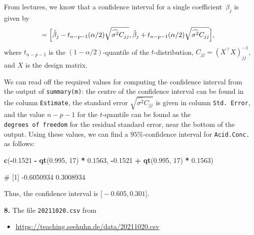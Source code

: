 \documentclass[
  a4paper,
]{article}
\newenvironment{Shaded}{\begin{snugshade}}{\end{snugshade}}
\newcommand{\DecValTok}[1]{\textcolor[rgb]{0.00,0.00,0.81}{#1}}
\newcommand{\FloatTok}[1]{\textcolor[rgb]{0.00,0.00,0.81}{#1}}
\newcommand{\FunctionTok}[1]{\textcolor[rgb]{0.13,0.29,0.53}{\textbf{#1}}}
\newcommand{\NormalTok}[1]{#1}
\newcommand{\SpecialCharTok}[1]{\textcolor[rgb]{0.81,0.36,0.00}{\textbf{#1}}}
\providecommand{\tightlist}{%
  \setlength{\itemsep}{0pt}\setlength{\parskip}{0pt}}
\theoremstyle{definition}
\theoremstyle{definition}
\theoremstyle{definition}
\theoremstyle{definition}
\theoremstyle{remark}
\begin{document}
\begin{myanswers}
From lectures, we know that a confidence interval for a single
coefficient~\(\beta_j\) is given by
\begin{equation*}
  [U, V]
  = \Bigl[ \hat\beta_j - t_{n-p-1}(\alpha/2) \sqrt{\widehat{\sigma^2} C_{jj}},
        \hat\beta_j + t_{n-p-1}(\alpha/2) \sqrt{\widehat{\sigma^2} C_{jj}} \Bigr],
\end{equation*}
where \(t_{n-p-1}\) is the \((1-\alpha/2)\)-quantile of the \(t\)-distribution,
\(C_{jj} = (X^\top X)^{-1}_{jj}\), and \(X\) is the design matrix.

We can read off the required values for computing the confidence
interval from the output of \texttt{summary(m)}: the centre of the
confidence interval can be found in the column \texttt{Estimate}, the
standard error \(\sqrt{\widehat{\sigma^2} C_{jj}}\) is given in column
\texttt{Std.\ Error}, and the value \(n-p-1\) for the \(t\)-quantile can be
found as the \texttt{degrees\ of\ freedom} for the residual standard error,
near the bottom of the output. Using these values, we can find a
\(95\%\)-confidence interval for \texttt{Acid.Conc.} as
follows:

\begin{Shaded}
\begin{Highlighting}[]
\FunctionTok{c}\NormalTok{(}\SpecialCharTok{{-}}\FloatTok{0.1521} \SpecialCharTok{{-}} \FunctionTok{qt}\NormalTok{(}\FloatTok{0.995}\NormalTok{, }\DecValTok{17}\NormalTok{) }\SpecialCharTok{*} \FloatTok{0.1563}\NormalTok{, }\SpecialCharTok{{-}}\FloatTok{0.1521} \SpecialCharTok{+} \FunctionTok{qt}\NormalTok{(}\FloatTok{0.995}\NormalTok{, }\DecValTok{17}\NormalTok{) }\SpecialCharTok{*} \FloatTok{0.1563}\NormalTok{)}
\end{Highlighting}
\end{Shaded}

\begin{Shaded}
\begin{Highlighting}[]
\NormalTok{\# [1] {-}0.6050934  0.3008934}
\end{Highlighting}
\end{Shaded}

Thus, the confidence interval is \(\bigl[ -0.605, 0.301 \bigr]\).

\end{myanswers}

\textbf{8.} The file \texttt{20211020.csv} from

\begin{itemize}
\tightlist
\item
  \url{https://teaching.seehuhn.de/data/20211020.csv}
\end{itemize}
\end{document}

